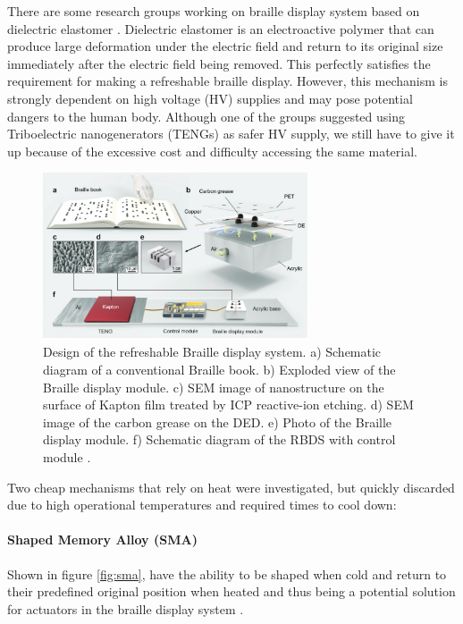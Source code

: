 There are some research groups working on braille display system based on dielectric elastomer \cite{qu_refreshable_2021}.
Dielectric elastomer is an electroactive polymer that can produce large deformation under the electric field and return to its original size immediately after the electric field being removed.
This perfectly satisfies the requirement for making a refreshable braille display.
However, this mechanism is strongly dependent on high voltage (HV) supplies and may pose potential dangers to the human body.
Although one of the groups suggested using Triboelectric nanogenerators (TENGs) as safer HV supply, we still have to give it up because of the excessive cost and difficulty accessing the same material. 

\begin{figure}[h]\centering
    \includegraphics[width=0.7\textwidth]{figures/teng.png}
    \caption{Design of the refreshable Braille display system. a) Schematic diagram of a conventional Braille book. b) Exploded view of the Braille display module. c) SEM image of nanostructure on the surface of Kapton film treated by ICP reactive-ion etching. d) SEM image of the carbon grease on the DED. e) Photo of the Braille display module. f) Schematic diagram of the RBDS with control module \cite{qu_refreshable_2021}.}
    \label{fig:teng.png}
\end{figure}

Two cheap mechanisms that rely on heat were investigated, but quickly discarded due to high operational temperatures and required times to cool down:

\paragraph{Shaped Memory Alloy (SMA)}
Shown in figure \ref{fig:sma}, have the ability to be shaped when cold and return to their predefined original position when heated and thus being a potential solution for actuators in the braille display system \cite{chaves_microtuators_2009}.

